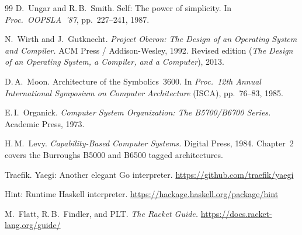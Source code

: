 \documentclass[11pt]{article}
\begin{document}
\begin{thebibliography}{99}
D.~Ungar and R.\,B.\ Smith.
\newblock Self: The power of simplicity.
\newblock In \emph{Proc.\ OOPSLA~'87}, pp.~227--241, 1987.


N.~Wirth and J.~Gutknecht.
\newblock \emph{Project Oberon: The Design of an Operating System and
  Compiler.}
\newblock ACM Press / Addison-Wesley, 1992.
\newblock Revised edition (\emph{The Design of an Operating System, a
  Compiler, and a Computer}), 2013.


D.\,A.\ Moon.
\newblock Architecture of the {Symbolics}~3600.
\newblock In \emph{Proc.\ 12th Annual International Symposium on
  Computer Architecture} (ISCA), pp.~76--83, 1985.

E.\,I.\ Organick.
\newblock \emph{Computer System Organization: The B5700/B6700 Series.}
\newblock Academic Press, 1973.

H.\,M.\ Levy.
\newblock \emph{Capability-Based Computer Systems.}
\newblock Digital Press, 1984.
\newblock Chapter~2 covers the Burroughs B5000 and B6500 tagged
  architectures.


Traefik.
\newblock Yaegi: Another elegant {Go} interpreter.
\newblock \url{https://github.com/traefik/yaegi}

Hint: Runtime {Haskell} interpreter.
\newblock \url{https://hackage.haskell.org/package/hint}

M.~Flatt, R.\,B.\ Findler, and PLT.
\newblock \emph{The Racket Guide.}
\newblock \url{https://docs.racket-lang.org/guide/}

\end{thebibliography}
\end{document}
